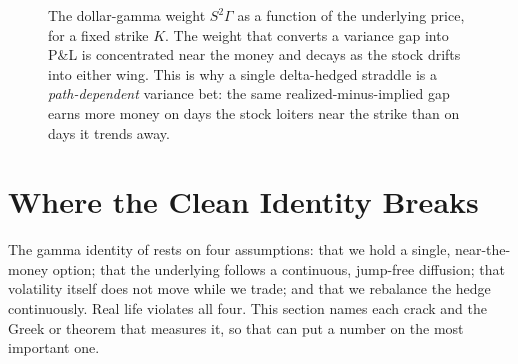 \begin{figure}[ht]
\centering
{}
\caption{The dollar-gamma weight $S^2\Gamma$ as a function of the underlying price, for a fixed strike $K$. The weight that converts a variance gap into P\&L is concentrated near the money and decays as the stock drifts into either wing. This is why a single delta-hedged straddle is a \emph{path-dependent} variance bet: the same realized-minus-implied gap earns more money on days the stock loiters near the strike than on days it trends away.}
\label{fig:ivrv:dollar-gamma}
\end{figure}

\section{Where the Clean Identity Breaks}
\label{sec:ivrv:breaks}

The gamma identity of  rests on four assumptions: that we hold a single, near-the-money option; that the underlying follows a continuous, jump-free diffusion; that volatility itself does not move while we trade; and that we rebalance the hedge continuously. Real life violates all four. This section names each crack and the Greek or theorem that measures it, so that  can put a number on the most important one.

